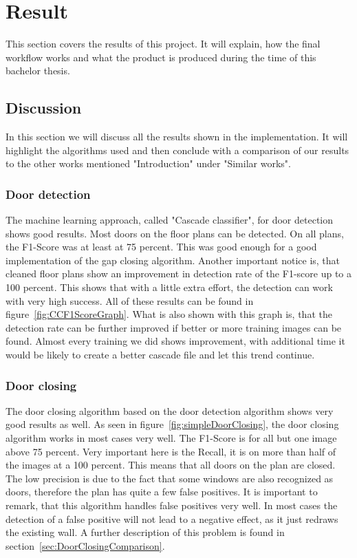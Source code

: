 \section{Result}
This section covers the results of this project. It will explain, how the final workflow works and what the product is produced during the time of this bachelor thesis.

\subsection{Discussion}
\label{sub:Discussion}
In this section we will discuss all the results shown in the implementation. It will highlight the algorithms used and then conclude with a comparison of our results to the other works mentioned "Introduction" under "Similar works".

\subsubsection{Door detection}
The machine learning approach, called "Cascade classifier", for door detection shows good results. Most doors on the floor plans can be detected. On all plans, the F1-Score was at least at 75 percent. This was good enough for a good implementation of the gap closing algorithm. Another important notice is, that cleaned floor plans show an improvement in detection rate of the F1-score up to a 100 percent. This shows that with a little extra effort, the detection can work with very high success. All of these results can be found in figure~\ref{fig:CCF1ScoreGraph}. What is also shown with this graph is, that the detection rate can be further improved if better or more training images can be found. Almost every training we did shows improvement, with additional time it would be likely to create a better cascade file and let this trend continue.

\subsubsection{Door closing}
The door closing algorithm based on the door detection algorithm shows very good results as well. As seen in figure~\ref{fig:simpleDoorClosing}, the door closing algorithm works in most cases very well. The F1-Score is for all but one image above 75 percent. Very important here is the Recall, it is on more than half of the images at a 100 percent. This means that all doors on the plan are closed. The low precision is due to the fact that some windows are also recognized as doors, therefore the plan has quite a few false positives. It is important to remark, that this algorithm handles false positives very well. In most cases the detection of a false positive will not lead to a negative effect, as it just redraws the existing wall. A further description of this problem is found in section~\ref{sec:DoorClosingComparison}.

